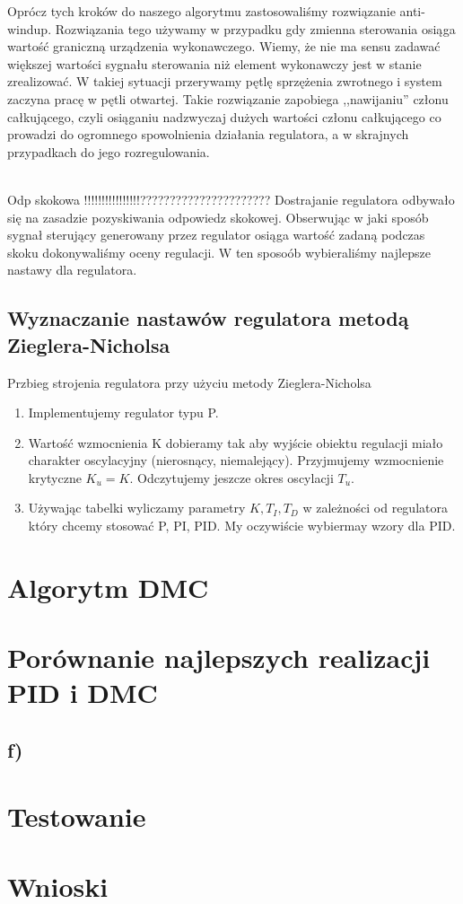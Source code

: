 \documentclass[12pt, a4paper]{article}
\begin{document}
Oprócz tych kroków do naszego algorytmu zastosowaliśmy rozwiązanie anti-windup. Rozwiązania tego używamy w przypadku gdy zmienna sterowania osiąga wartość graniczną urządzenia wykonawczego. Wiemy, że nie ma sensu zadawać większej wartości sygnału sterowania niż element wykonawczy jest w stanie zrealizować. W takiej sytuacji przerywamy pętlę sprzężenia zwrotnego i system zaczyna pracę w pętli otwartej. Takie rozwiązanie zapobiega ,,nawijaniu'' członu całkującego, czyli osiąganiu nadzwyczaj dużych wartości członu całkującego co prowadzi do ogromnego spowolnienia działania regulatora, a w skrajnych przypadkach do jego rozregulowania. 

~\\

Odp skokowa !!!!!!!!!!!!!!!!??????????????????????
Dostrajanie regulatora odbywało się na zasadzie pozyskiwania odpowiedz skokowej. Obserwując w jaki sposób sygnał sterujący generowany przez regulator osiąga wartość zadaną podczas skoku dokonywaliśmy oceny regulacji. W ten sposoób wybieraliśmy najlepsze nastawy dla regulatora. 

\subsection{Wyznaczanie nastawów regulatora metodą Zieglera-Nicholsa}

Przbieg strojenia regulatora przy użyciu metody Zieglera-Nicholsa
\begin{enumerate}
\item Implementujemy regulator typu P.
\item Wartość wzmocnienia K dobieramy tak aby wyjście obiektu regulacji miało charakter oscylacyjny (nierosnący, niemalejący). Przyjmujemy wzmocnienie krytyczne $K_{u} = K$. Odczytujemy jeszcze okres oscylacji $T_{u}$.
\item Używając tabelki wyliczamy parametry $K, T_{I}, T_{D}$ w zależności od regulatora który chcemy stosować P, PI, PID. My oczywiście wybiermay wzory dla PID. 

\end{enumerate}

\section{Algorytm DMC}

\section{Porównanie najlepszych realizacji PID i DMC}

\subsection{f) }
\begin{figure}[h!]
\end{figure}

\section{Testowanie}

\section{Wnioski}
\end{document}
